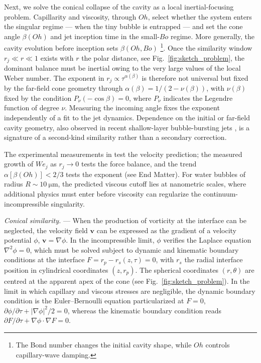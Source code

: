 \documentclass[aps,prl,reprint,floatfix]{revtex4-2}
\begin{document}
Next, we solve the conical collapse of the cavity as a local inertial-focusing problem. Capillarity and viscosity, through $Oh$, select whether the system enters the singular regime --- when the tiny bubble is entrapped --- and set the cone angle $\beta(Oh)$ and jet inception time in the small-$Bo$ regime. More generally, the cavity evolution before inception sets $\beta(Oh,Bo)$ \footnote{The Bond number changes the initial cavity shape, while $Oh$ controls capillary-wave damping.}. Once the similarity window $r_j\ll r\ll1$ exists with $r$ the polar distance, see Fig.~\ref{fig:sketch_problem}, the dominant balance must be inertial owing to the very large values of the local Weber number. The exponent in $r_j\propto \tau^{\alpha(\beta)}$ is therefore not universal but fixed by the far-field cone geometry through $\alpha(\beta)=1/(2-\nu(\beta))$, with $\nu(\beta)$ fixed by the condition $P_\nu(-\cos\beta)=0$, where $P_\nu$ indicates the Legendre function of degree $\nu$. Measuring the incoming angle fixes the exponent independently of a fit to the jet dynamics. Dependence on the initial or far-field cavity geometry, also observed in recent shallow-layer bubble-bursting jets \cite{YangShallow2026}, is a signature of a second-kind similarity rather than a secondary correction.

The experimental measurements in \cite{PRLCattaneo} test the velocity prediction; the measured growth of $We_j$ as $r_j \to 0$ tests the force balance, and the trend $\alpha[\beta(Oh)]<2/3$ tests the exponent (see End Matter). For water bubbles of radius $R\sim\SI{10}{\micro\meter}$, the predicted viscous cutoff lies at nanometric scales, where additional physics must enter before viscosity can regularize the continuum-incompressible singularity.

\emph{Conical similarity.} --- When the production of vorticity at the interface can be neglected, the velocity field $\mathbf{v}$ can be expressed as the gradient of a velocity potential $\phi$, $\mathbf{v}=\nabla\phi$. In the incompressible limit, $\phi$ verifies the Laplace equation $\nabla^2\phi=0$, which must be solved subject to dynamic and kinematic boundary conditions at the interface $F=r_p-r_s(z,\tau)=0$, with $r_s$ the radial interface position in cylindrical coordinates $(z,r_p)$. The spherical coordinates $(r,\theta)$ are centred at the apparent apex of the cone (see Fig.~\ref{fig:sketch_problem}). In the limit in which capillary and viscous stresses are negligible, the dynamic boundary condition is the Euler--Bernoulli equation particularized at $F=0$, $\partial\phi/\partial \tau+|\nabla\phi|^2/2=0$, whereas the kinematic boundary condition reads $\partial F/\partial \tau+\nabla\phi\cdot\nabla F=0$.
\end{document}
